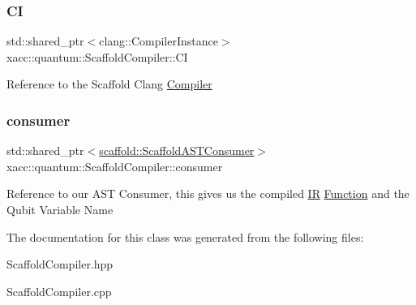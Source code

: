 \subsubsection{\texorpdfstring{CI}{CI}}
{\footnotesize\ttfamily std\+::shared\+\_\+ptr$<$clang\+::\+Compiler\+Instance$>$ xacc\+::quantum\+::\+Scaffold\+Compiler\+::\+CI\hspace{0.3cm}{\ttfamily [protected]}}

Reference to the Scaffold Clang \hyperlink{a02448}{Compiler} \mbox{\label{a01236_a74f86a2074ec8bd5eeea3ad992433091}} 
\subsubsection{\texorpdfstring{consumer}{consumer}}
{\footnotesize\ttfamily std\+::shared\+\_\+ptr$<$\hyperlink{a01232}{scaffold\+::\+Scaffold\+A\+S\+T\+Consumer}$>$ xacc\+::quantum\+::\+Scaffold\+Compiler\+::consumer\hspace{0.3cm}{\ttfamily [protected]}}

Reference to our A\+ST Consumer, this gives us the compiled \hyperlink{a02480}{IR} \hyperlink{a02456}{Function} and the Qubit Variable Name 

The documentation for this class was generated from the following files\+:\begin{DoxyCompactItemize}
\item 
Scaffold\+Compiler.\+hpp\item 
Scaffold\+Compiler.\+cpp\end{DoxyCompactItemize}

